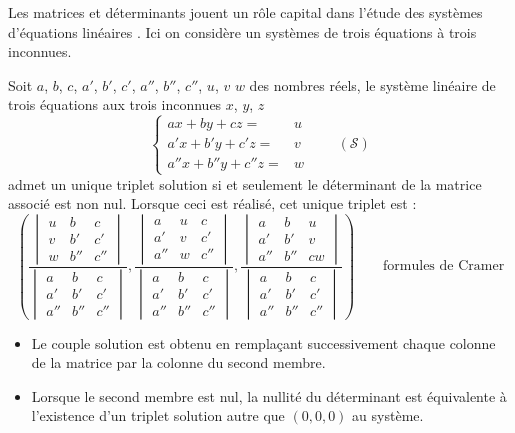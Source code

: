 \begin{description}
Les matrices et déterminants jouent un rôle capital dans l'étude des systèmes d'équations linéaires . Ici on considère un systèmes de trois équations à trois inconnues.
\begin{prop}Soit $a$, $b$, $c$, $a'$, $b'$, $c'$, $a''$, $b''$, $c''$, $u$, $v$ $w$ des nombres réels, le système linéaire de trois équations aux trois inconnues $x$, $y$, $z$ 
\begin{equation*}
 \left\lbrace 
\begin{aligned}
 a x + by +cz =& u \\
 a' x + b'y +c'z =& v \\
a'' x + b''y +c''z =& w
\end{aligned}\right.  \qquad (\mathcal S)
\end{equation*}
admet un unique triplet solution si et seulement le déterminant de la matrice associé est non nul. Lorsque ceci est réalisé, cet unique triplet est :
\begin{displaymath}
 (\dfrac
{
\begin{vmatrix}
  u & b & c\\
  v & b' & c'\\
 w & b'' & c''
\end{vmatrix}
}
{
\begin{vmatrix}
  a & b & c\\
  a' & b'& c' \\
 a'' & b'' & c''
 \end{vmatrix}} , 
\dfrac
{
\begin{vmatrix}
  a & u & c\\
  a' & v & c'\\
a'' & w & c''
\end{vmatrix}
}
{
\begin{vmatrix}
  a & b & c\\
  a' & b'& c' \\
 a'' & b'' & c''
 \end{vmatrix}},
\dfrac
{
\begin{vmatrix}
  a & b & u\\
  a' & b' & v\\
a'' & b'' & cw
\end{vmatrix}
}
{
\begin{vmatrix}
  a & b & c\\
  a' & b'& c' \\
 a'' & b'' & c''
 \end{vmatrix}}
) \qquad \text{formules de Cramer}
\end{displaymath}
\end{prop}
\begin{rems}
 \begin{itemize}
  \item Le couple solution est obtenu en remplaçant successivement chaque colonne de la matrice par la colonne du second membre.
  \item Lorsque le second membre est nul, la nullité du déterminant est équivalente à l'existence d'un triplet solution autre que $(0,0,0)$ au système.
 \end{itemize}
\end{rems}


\end{description}
